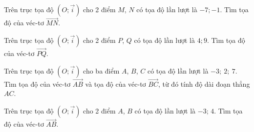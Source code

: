 \begin{bt}%
Trên trục tọa độ $\left(O;\overrightarrow{i}\right)$ cho 2 điểm $M$, $N$ có tọa độ lần lượt là $-7; -1$. Tìm tọa độ của véc-tơ $\overrightarrow{MN}$.
\end{bt}

\begin{bt}%
Trên trục tọa độ $\left(O;\overrightarrow{i}\right)$ cho 2 điểm $P$, $Q$ có tọa độ lần lượt là $4; 9$. Tìm tọa độ của véc-tơ $\overrightarrow{PQ}$.
\end{bt}

\begin{bt}%
	Trên trục tọa độ $\left(O;\overrightarrow{i}\right)$ cho ba điểm $A$, $B$, $C$ có tọa độ lần lượt là $-3;\ 2;\ 7$. Tìm tọa độ của véc-tơ $\overrightarrow{AB}$ và tọa độ của véc-tơ $\overrightarrow{BC}$, từ đó tính độ dài đoạn thẳng $AC$.
\end{bt}

\begin{bt}%
	Trên trục tọa độ $\left(O;\overrightarrow{i}\right)$ cho 2 điểm $A$, $B$ có tọa độ lần lượt là $-3$; $4$. Tìm tọa độ của véc-tơ $\overrightarrow{AB}$.
\end{bt}

